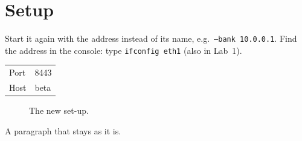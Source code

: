 \documentclass{article}
\newcommand{\code}[1]{\texttt{#1}}
\begin{document}
\section{Setup}
Start it again with the
address instead of its name, e.g.\ \code{--bank 10.0.0.1}. Find the address
in the console: type \code{ifconfig eth1} (also in Lab~1).

\begin{tabular}{ll}
Port & 8443 \\
Host & beta \\
\end{tabular}

\begin{figure}[h]
\centering
{}
\caption{The new set-up.}
\end{figure}

A paragraph that stays as it is.
\end{document}
